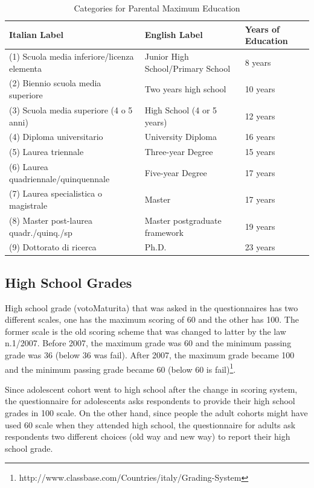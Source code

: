 \begin{table}[H]
\caption{Categories for Parental Maximum Education} \label{tab:par-maxedu}
\begin{center}
\begin{tabular}{L{4.3cm} L{4.3cm} L{4.3cm}}
\toprule
\textbf{Italian Label} & \textbf{English Label} & \textbf{Years of Education} \\ \midrule
	(1) Scuola media inferiore/licenza elementa &	Junior High School/Primary School		& 8 years \\
	(2) Biennio scuola media superiore & 				Two years high school								& 10 years \\
	(3) Scuola media superiore (4 o 5 anni) & 		High School (4 or 5 years)								& 12 years \\
	(4) Diploma universitario &	University Diploma & 16 years \\
	(5) Laurea triennale &	Three-year Degree &	15 years \\
	(6) Laurea quadriennale/quinquennale &   	Five-year Degree & 17 years \\
	(7) Laurea specialistica o magistrale & 			Master & 17 years \\
	(8) Master post-laurea quadr./quinq./sp  & Master postgraduate framework			& 19 years \\
	(9) Dottorato di ricerca 	& Ph.D.	& 23 years \\ \bottomrule
\end{tabular}
\end{center}
\end{table}

\subsection{High School Grades}
High school grade (votoMaturita) that was asked in the questionnaires has two different scales, one has the maximum scoring of 60 and the other has 100. The former scale is the old scoring scheme that was changed to latter by the law n.1/2007. Before 2007, the maximum grade was 60 and the minimum passing grade was 36 (below 36 was fail). After 2007, the maximum grade became 100 and the minimum passing grade became 60 (below 60 is fail)\footnote{http://www.classbase.com/Countries/italy/Grading-System}.

Since adolescent cohort went to high school after the change in scoring system, the questionnaire for adolescents asks respondents to provide their high school grades in 100 scale. On the other hand, since people the adult cohorts might have used 60 scale when they attended high school, the questionnaire for adults ask respondents two different choices (old way and new way) to report their high school grade. 


